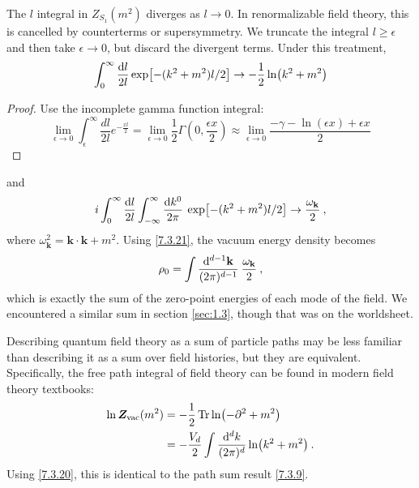The $l$ integral in $Z_{S_{1}}(m^{2})$ diverges as $l \rightarrow 0 $. In renormalizable field theory, this is cancelled by counterterms or supersymmetry. 
We truncate the integral $l \geq \epsilon$ and then take $\epsilon \rightarrow 0$, but discard the divergent terms. Under this treatment, 
\begin{equation}
	\int_{0}^{\infty} \frac{\mathrm{d} l}{2 l} \exp [-(k^{2}+m^{2}) l / 2] \rightarrow-\frac{1}{2} \ln(k^{2}+m^{2}) \label{7.3.20} 
\end{equation}
\begin{tcolorbox}
	\begin{proof}
		Use the incomplete gamma function integral:
		\begin{equation}
			\lim_{\epsilon\to0}\int_{\epsilon}^{\infty}\frac{dl}{2l}e^{-\frac{xl}{2}}=\lim_{\epsilon\to0}\frac{1}{2}\Gamma\left(0,\frac{\epsilon x}{2}\right)\approx \lim_{\epsilon\to0}\frac{-\gamma -\ln(\epsilon x)+\epsilon x}{2}
		\end{equation}
	\end{proof}
\end{tcolorbox}
and 
\begin{equation}
	i \int_{0}^{\infty} \frac{\mathrm{d} l}{2 l} \int_{-\infty}^{\infty} \frac{\mathrm{d} k^{0}}{2 \pi} \: 
	\exp [-(k^{2}+m^{2})l/2] \rightarrow \frac{\omega_{\mathbf{k}}}{2} \:, \label{7.3.21} 
\end{equation}
where $\omega_{\mathbf{k}}^{2}=\mathbf{k} \cdot \mathbf{k}+m^{2}$. 
Using \eqref{7.3.21}, the vacuum energy density becomes 
\begin{equation}
	\rho_{0}=\int \frac{\mathrm{d}^{d-1} \mathbf{k}}{(2 \pi)^{d-1}} \: \frac{\omega_{\mathbf{k}}}{2} \:, \label{7.3.22} 
\end{equation}
which is exactly the sum of the zero-point energies of each mode of the field. We encountered a similar sum in section \ref{sec:1.3}, though that was on the worldsheet. 

Describing quantum field theory as a sum of particle paths may be less familiar than describing it as a sum over field histories, but they are equivalent. 
Specifically, the free path integral of field theory can be found in modern field theory textbooks: 
\begin{align}
	\ln \bm{Z}_{\mathrm{vac}}(m^{2}) &=-\frac{1}{2} \operatorname{Tr} \ln (-\partial^{2}+m^{2}) \nonumber \\
	&=-\frac{V_{d}}{2} \int \frac{\mathrm{d}^{d} k}{(2 \pi)^{d}} \ln (k^{2}+m^{2}) \:. \label{7.3.23} 
\end{align}
Using \eqref{7.3.20}, this is identical to the path sum result \eqref{7.3.9}. 

